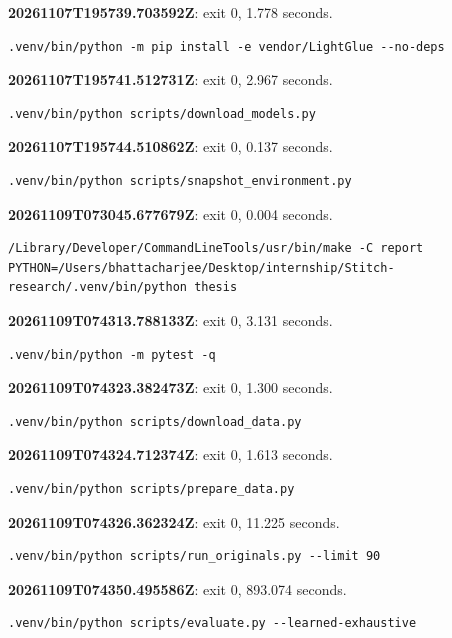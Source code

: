 \noindent\textbf{20261107T195739.703592Z}: exit 0, 1.778 seconds.
\begin{lstlisting}[numbers=none]
.venv/bin/python -m pip install -e vendor/LightGlue --no-deps
\end{lstlisting}

\noindent\textbf{20261107T195741.512731Z}: exit 0, 2.967 seconds.
\begin{lstlisting}[numbers=none]
.venv/bin/python scripts/download_models.py
\end{lstlisting}

\noindent\textbf{20261107T195744.510862Z}: exit 0, 0.137 seconds.
\begin{lstlisting}[numbers=none]
.venv/bin/python scripts/snapshot_environment.py
\end{lstlisting}

\noindent\textbf{20261109T073045.677679Z}: exit 0, 0.004 seconds.
\begin{lstlisting}[numbers=none]
/Library/Developer/CommandLineTools/usr/bin/make -C report PYTHON=/Users/bhattacharjee/Desktop/internship/Stitch-research/.venv/bin/python thesis
\end{lstlisting}

\noindent\textbf{20261109T074313.788133Z}: exit 0, 3.131 seconds.
\begin{lstlisting}[numbers=none]
.venv/bin/python -m pytest -q
\end{lstlisting}

\noindent\textbf{20261109T074323.382473Z}: exit 0, 1.300 seconds.
\begin{lstlisting}[numbers=none]
.venv/bin/python scripts/download_data.py
\end{lstlisting}

\noindent\textbf{20261109T074324.712374Z}: exit 0, 1.613 seconds.
\begin{lstlisting}[numbers=none]
.venv/bin/python scripts/prepare_data.py
\end{lstlisting}

\noindent\textbf{20261109T074326.362324Z}: exit 0, 11.225 seconds.
\begin{lstlisting}[numbers=none]
.venv/bin/python scripts/run_originals.py --limit 90
\end{lstlisting}

\noindent\textbf{20261109T074350.495586Z}: exit 0, 893.074 seconds.
\begin{lstlisting}[numbers=none]
.venv/bin/python scripts/evaluate.py --learned-exhaustive
\end{lstlisting}


